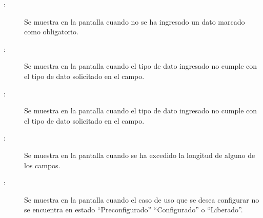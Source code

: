 \begin{description}
	\item[:] Se muestra en la pantalla  cuando no se ha ingresado un dato marcado como obligatorio.
	\item[:] Se muestra en la pantalla  cuando el tipo de dato ingresado no cumple con el tipo de dato solicitado en el campo.
	\item[:] Se muestra en la pantalla  cuando el tipo de dato ingresado no cumple con el tipo de dato solicitado en el campo.
	\item [:] Se muestra en la pantalla  cuando se ha excedido la longitud de alguno de los campos.
	\item [:] Se muestra en la pantalla  cuando el caso de uso que se desea configurar no se encuentra en estado ``Preconfigurado'' ``Configurado'' o ``Liberado''.
\end{description}
